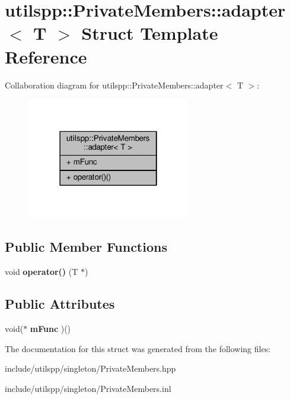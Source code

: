 \hypertarget{structutilspp_1_1PrivateMembers_1_1adapter}{\section{utilspp\-:\-:Private\-Members\-:\-:adapter$<$ T $>$ Struct Template Reference}
\label{structutilspp_1_1PrivateMembers_1_1adapter}
}


Collaboration diagram for utilspp\-:\-:Private\-Members\-:\-:adapter$<$ T $>$\-:\nopagebreak
\begin{figure}[H]
\begin{center}
\leavevmode
\includegraphics[width=202pt]{structutilspp_1_1PrivateMembers_1_1adapter__coll__graph}
\end{center}
\end{figure}
\subsection*{Public Member Functions}
\begin{DoxyCompactItemize}
\item 
\hypertarget{structutilspp_1_1PrivateMembers_1_1adapter_a2be7b2ab20c93e9c299a6eeeeb06d4d9}{void {\bfseries operator()} (T $\ast$)}\label{structutilspp_1_1PrivateMembers_1_1adapter_a2be7b2ab20c93e9c299a6eeeeb06d4d9}

\end{DoxyCompactItemize}
\subsection*{Public Attributes}
\begin{DoxyCompactItemize}
\item 
\hypertarget{structutilspp_1_1PrivateMembers_1_1adapter_ab8ad3f1f149b6e5ad4554a7c0d6718ad}{void($\ast$ {\bfseries m\-Func} )()}\label{structutilspp_1_1PrivateMembers_1_1adapter_ab8ad3f1f149b6e5ad4554a7c0d6718ad}

\end{DoxyCompactItemize}


The documentation for this struct was generated from the following files\-:\begin{DoxyCompactItemize}
\item 
include/utilspp/singleton/Private\-Members.\-hpp\item 
include/utilspp/singleton/Private\-Members.\-inl\end{DoxyCompactItemize}
